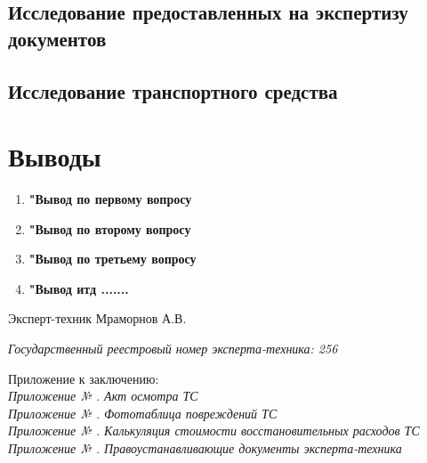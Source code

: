 \subsection{Исследование предоставленных на экспертизу документов}
%
% 
\subsection{Исследование транспортного средства}
%
%




\section{Выводы}

\begin{enumerate}
	\item \textbf{"Вывод по первому вопросу}\\[3mm]
	\item \textbf{"Вывод по второму вопросу}\\[3mm]
	\item \textbf{"Вывод по третьему вопросу}\\[3mm]
	\item \textbf{"Вывод  итд .......}\\[3mm]
	
	\vspace{5mm}
	
\end{enumerate}
    
\vspace{10mm}

\noindent Эксперт-техник   \hfill        Мраморнов А.В.

\vspace{1mm}
\noindent   \textit{  Государственный  реестровый номер эксперта-техника:   256}\\

\vspace{15mm}

\relax
\noindent Приложение к заключению:\\
\textit{
	Приложение № \Rownum. Акт осмотра ТС \\
	Приложение № \Rownum. Фототаблица повреждений ТС\\
	Приложение № \Rownum. Калькуляция стоимости восстановительных расходов ТС \\
	Приложение № \Rownum. Правоустанавливающие документы эксперта-техника\\
}

%
%

%
%